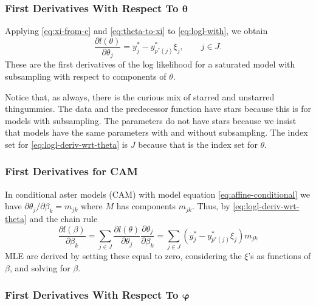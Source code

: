 \subsubsection{First Derivatives With Respect To $\boldsymbol{\theta}$}
\label{sec:wrt-theta}

Applying \eqref{eq:xi-from-c} and \eqref{eq:theta-to-xi}
to \eqref{eq:logl-with}, we obtain
\begin{equation} \label{eq:logl-deriv-wrt-theta}
   \frac{\partial l(\theta)}{\partial \theta_j}
   =
   y^*_j - y^*_{p^*(j)} \xi_j,
   \qquad j \in J.
\end{equation}
These are the first derivatives of the log likelihood for a saturated model
with subsampling with respect to components of $\theta$.

Notice that, as always, there is the curious mix of starred and unstarred
thingummies.  The data and the predecessor function have stars because this
is for models with subsampling.  The parameters do not have stars because
we insist that models have the same parameters with and without subsampling.
The index set for \eqref{eq:logl-deriv-wrt-theta} is $J$ because that is
the index set for $\theta$.

\subsubsection{First Derivatives for CAM}
\label{sec:logl-cam-deriv}

In conditional aster models (CAM) with model equation
\eqref{eq:affine-conditional}
we have $\partial \theta_j / \partial \beta_k = m_{j k}$
where $M$ has components $m_{j k}$.
Thus, by \eqref{eq:logl-deriv-wrt-theta} and the chain rule
$$
   \frac{\partial l(\beta)}{\partial \beta_k}
   =
   \sum_{j \in J}
   \frac{\partial l(\theta)}{\partial \theta_j}
   \frac{\partial \theta_j}{\partial \beta_k}
   =
   \sum_{j \in J} ( y^*_j - y^*_{p^*(j)} \xi_j ) m_{j k}
$$
MLE are derived by setting these equal to zero, considering the $\xi$'s
as functions of $\beta$, and solving for $\beta$.

\subsubsection{First Derivatives With Respect To $\boldsymbol{\varphi}$}
\label{sec:wrt-phi}

